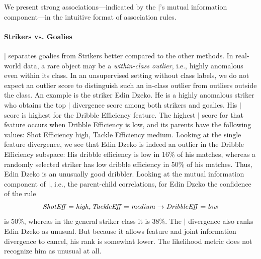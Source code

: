 																		We present strong associations---indicated by the $\mid$'s mutual information component---in the intuitive format of association rules.
																		
																		\paragraph{Strikers vs. Goalies} 
																		$\mid$ separates goalies from Strikers better compared to the other methods.  
																		In real-world data, a rare object may be a {\em within-class outlier}, i.e., highly anomalous even within its class. In an unsupervised setting without class labels, we do not expect an outlier score to distinguish such an in-class outlier from outliers outside the class. 
																		An example is the striker Edin Dzeko. He is a highly anomalous striker who obtains 
																		the top $\mid$ divergence score among both strikers and goalies. His $\mid$ score is highest for the Dribble Efficiency feature. The highest $\mid$ score for that feature occurs when Dribble Efficiency is low, and its parents have the following values: Shot Efficiency high, Tackle Efficiency medium. Looking at the single feature divergence, 
																		we see that Edin Dzeko is indeed an outlier in the Dribble Efficiency subspace: His dribble efficiency is low in 16\% of his matches, whereas a randomly selected striker has low dribble efficiency in 50\% of his matches. Thus, Edin Dzeko is an unusually good dribbler. Looking at the mutual information component of $\mid$, i.e., the parent-child correlations, for Edin Dzeko the confidence of the rule 
																		$$\it{ShotEff} = \it{high}, \it{TackleEff} = \it{medium}\rightarrow \it{DribbleEff} = \it{low}$$ is 50\%, whereas in the general striker class it is $38\%$.
																		The $\mid$ divergence also ranks Edin Dzeko as unusual. But because it allows feature and joint information divergence to cancel, his rank is somewhat lower. The likelihood metric does not recognize him as unusual at all. 
																		
